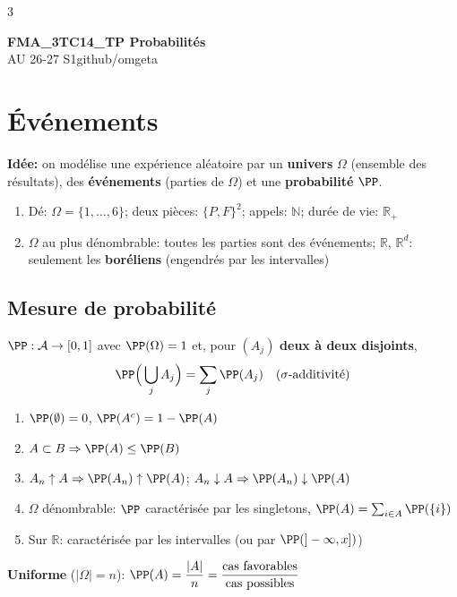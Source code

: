\documentclass[12pt, a4paper]{article}
\newcommand{\mytitle}{FMA\_3TC14\_TP Probabilités}
\newcommand{\myauthor}{github/omgeta}
\newcommand{\mydate}{AU 26-27 S1}
\newcommand{\R}{\mathbb{R}}
\newcommand{\N}{\mathbb{N}}
\begin{document}
\raggedright
\raggedcolumns
\footnotesize
\begin{multicols*}{3}
	\setlength{\premulticols}{1pt}
	\setlength{\postmulticols}{1pt}
	\setlength{\multicolsep}{1pt}
	\setlength{\columnsep}{2pt}

	{\normalsize{\textbf{\mytitle}}}\\
	{\footnotesize{\mydate\hspace{2pt}\textemdash\hspace{2pt}\myauthor}}

	\section{Événements}
	\textbf{Idée:} on modélise une expérience aléatoire par un \textbf{univers} $\Omega$ (ensemble des résultats), des \textbf{événements} (parties de $\Omega$) et une \textbf{probabilité} $\PP$.
	\begin{enumerate}[\roman*.]
		\item Dé: $\Omega=\{1,\dots,6\}$; deux pièces: $\{P,F\}^2$; appels: $\N$; durée de vie: $\R_+$
		\item $\Omega$ au plus dénombrable: toutes les parties sont des événements; $\R$, $\R^d$: seulement les \textbf{boréliens} (engendrés par les intervalles)
	\end{enumerate}

	\subsection{Mesure de probabilité}
	$\PP:\mathcal A\to[0,1]$ avec $\PP(\Omega)=1$ et, pour $(A_j)$ \textbf{deux à deux disjoints},
	\begin{gather*}
		\PP\Big(\bigcup_jA_j\Big)=\sum_j\PP(A_j)\quad\text{($\sigma$-additivité)}
	\end{gather*}
	\begin{enumerate}[\roman*.]
		\item $\PP(\emptyset)=0$, $\PP(A^c)=1-\PP(A)$
		\item $A\subset B\Rightarrow\PP(A)\leq\PP(B)$
		\item $A_n\uparrow A\Rightarrow\PP(A_n)\uparrow\PP(A)$; $A_n\downarrow A\Rightarrow\PP(A_n)\downarrow\PP(A)$
		\item $\Omega$ dénombrable: $\PP$ caractérisée par les singletons, $\PP(A)=\sum_{i\in A}\PP(\{i\})$
		\item Sur $\R$: caractérisée par les intervalles (ou par $\PP(]-\infty,x])$)
	\end{enumerate}
	\textbf{Uniforme} ($|\Omega|=n$): $\PP(A)=\dfrac{|A|}{n}=\dfrac{\text{cas favorables}}{\text{cas possibles}}$


\end{multicols*}
\end{document}

